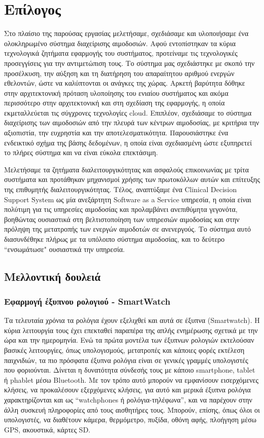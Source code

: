 \chapter{Επίλογος}\label{ch:conclusion}

		Στο πλαίσιο της παρούσας εργασίας μελετήσαμε, σχεδιάσαμε και υλοποιήσαμε ένα ολοκληρωμένο σύστημα διαχείρισης αιμοδοσιών. Αφού εντοπίστηκαν τα κύρια τεχνολογικά ζητήματα εφαρμογής του συστήματος, προτείναμε τις τεχνολογικές προσεγγίσεις για την αντιμετώπιση τους. Το σύστημα μας σχεδιάστηκε με σκοπό την προσέλκυση, την αύξηση και τη διατήρηση του απαραίτητου αριθμού ενεργών εθελοντών, ώστε να καλύπτονται οι ανάγκες της χώρας. Αρκετή βαρύτητα δόθηκε στην αρχιτεκτονική πρόταση υλοποίησης του ενιαίου συστήματος και ακόμα περισσότερο στην αρχιτεκτονική και στη σχεδίαση της εφαρμογής, η οποία εκμεταλλεύεται τις σύγχρονες τεχνολογίες cloud. Επιπλέον, σχεδιάσαμε το σύστημα διαχείρισης των αιμοδοσιών από την πλευρά των κέντρων αιμοδοσίας, με κριτήρια την αξιοπιστία, την ευχρηστία και την αποτελεσματικότητα. Παρουσιάστηκε ένα ενδεικτικό σχήμα της βάσης δεδομένων, η οποία είναι σχεδιασμένη ώστε εξυπηρετεί το πλήρες σύστημα και να είναι εύκολα επεκτάσιμη.
		
		Μελετήσαμε τα ζητήματα διαλειτουργικότητας και ασφαλούς επικοινωνίας με τρίτα συστήματα και προτάθηκαν μηχανισμοί χρήσης των πρωτοκόλλων αυτών και επίτευξης της επιθυμητής διαλειτουργικότητας. Τέλος, αναπτύξαμε ένα Clinical Decision Support System ως μία ανεξάρτητη Software as a Service υπηρεσία, η οποία είναι πολύτιμη για τις υπηρεσίες αιμοδοσίας και προλαμβάνει ανεπιθύμητα γεγονότα, βοηθώντας ουσιαστικά στη βελτιστοποίηση των υπηρεσιών αιμοδοσίας και στην πρόληψη  της μετατροπής των ενεργών αιμοδοτών σε ανενεργούς. Το σύστημα αυτό διασυνδέθηκε πλήρως με τα υπόλοιπο σύστημα αιμοδοσίας, και το δεύτερο ``ενσωμάτωσε" ουσιαστικά την υπηρεσία.
		
\section{Μελλοντική δουλειά}
	\subsection{Εφαρμογή έξυπνου ρολογιού - SmartWatch}
	
	
		Τα τελευταία χρόνια τα ρολόγια έχουν εξελιχθεί και αυτά σε έξυπνα (Smartwatch). Η κύρια λειτουργία τους έχει επεκταθεί παραπέρα της απλής ενημέρωσης σχετικά με την ώρα και την ημερομηνία. Ενώ τα πρώτα μοντέλα των έξυπνων ρολογιών εκτελούσαν βασικές λειτουργίες, όπως υπολογισμούς, μετατροπές και κάποιες φορές εκτέλεση παιχνιδιών, τα πιο πρόσφατα έξυπνα ρολόγια είναι σε γενικές γραμμές υπολογιστές που φοριούνται. Δίνεται η δυνατότητα σύνδεσής τους με κάποιο smartphone, tablet ή phablet μέσω Bluetooth. Με τον τρόπο αυτό μπορούν να εμφανίσουν εισερχόμενες κλήσεις, να προκαλέσουν εξερχόμενες κλήσεις, για αυτό και μερικά έξυπνα ρολόγια χαρακτηρίζονται και ως “watchphones ή ρολόγια-τηλέφωνα”, και να παρέχουν στην άλλη συσκευή πληροφορίες από τους αισθητήρες τους. Μπορούν, επίσης, όπως όλοι οι υπολογιστές, να διαθέτουν κάμερα, θερμόμετρο, πυξίδα, οθόνη αφής, πλοήγηση μέσω GPS, ακουστικά, κάρτες SD.	
	
